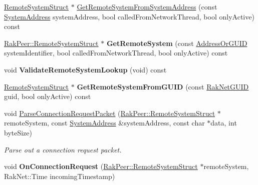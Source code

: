 \begin{DoxyCompactItemize}
\item 
\hyperlink{struct_rak_net_1_1_rak_peer_1_1_remote_system_struct}{Remote\-System\-Struct} $\ast$ \hyperlink{class_rak_net_1_1_rak_peer_a380285f3ca2ce6bc081fc8fcb4541cc9}{Get\-Remote\-System\-From\-System\-Address} (const \hyperlink{struct_rak_net_1_1_system_address}{System\-Address} system\-Address, bool called\-From\-Network\-Thread, bool only\-Active) const 
\item 
\hypertarget{class_rak_net_1_1_rak_peer_a56b350b39c6f92c04242eb7eff4d36b1}{\hyperlink{struct_rak_net_1_1_rak_peer_1_1_remote_system_struct}{Rak\-Peer\-::\-Remote\-System\-Struct} $\ast$ {\bfseries Get\-Remote\-System} (const \hyperlink{struct_rak_net_1_1_address_or_g_u_i_d}{Address\-Or\-G\-U\-I\-D} system\-Identifier, bool called\-From\-Network\-Thread, bool only\-Active) const }\label{class_rak_net_1_1_rak_peer_a56b350b39c6f92c04242eb7eff4d36b1}

\item 
\hypertarget{class_rak_net_1_1_rak_peer_ad93c09bd2360a5951b0357298e77094f}{void {\bfseries Validate\-Remote\-System\-Lookup} (void) const }\label{class_rak_net_1_1_rak_peer_ad93c09bd2360a5951b0357298e77094f}

\item 
\hypertarget{class_rak_net_1_1_rak_peer_af01e4d43356deb8b1479c0e67cdf01ff}{\hyperlink{struct_rak_net_1_1_rak_peer_1_1_remote_system_struct}{Remote\-System\-Struct} $\ast$ {\bfseries Get\-Remote\-System\-From\-G\-U\-I\-D} (const \hyperlink{struct_rak_net_1_1_rak_net_g_u_i_d}{Rak\-Net\-G\-U\-I\-D} guid, bool only\-Active) const }\label{class_rak_net_1_1_rak_peer_af01e4d43356deb8b1479c0e67cdf01ff}

\item 
\hypertarget{class_rak_net_1_1_rak_peer_ae483d3f2306ada5fc2d79bde1663130d}{void \hyperlink{class_rak_net_1_1_rak_peer_ae483d3f2306ada5fc2d79bde1663130d}{Parse\-Connection\-Request\-Packet} (\hyperlink{struct_rak_net_1_1_rak_peer_1_1_remote_system_struct}{Rak\-Peer\-::\-Remote\-System\-Struct} $\ast$remote\-System, const \hyperlink{struct_rak_net_1_1_system_address}{System\-Address} \&system\-Address, const char $\ast$data, int byte\-Size)}\label{class_rak_net_1_1_rak_peer_ae483d3f2306ada5fc2d79bde1663130d}

\begin{DoxyCompactList}\small\item\em Parse out a connection request packet. \end{DoxyCompactList}\item 
\hypertarget{class_rak_net_1_1_rak_peer_abafe08d5b20051e008ef07025e4215e9}{void {\bfseries On\-Connection\-Request} (\hyperlink{struct_rak_net_1_1_rak_peer_1_1_remote_system_struct}{Rak\-Peer\-::\-Remote\-System\-Struct} $\ast$remote\-System, Rak\-Net\-::\-Time incoming\-Timestamp)}\label{class_rak_net_1_1_rak_peer_abafe08d5b20051e008ef07025e4215e9}


\end{DoxyCompactItemize}

